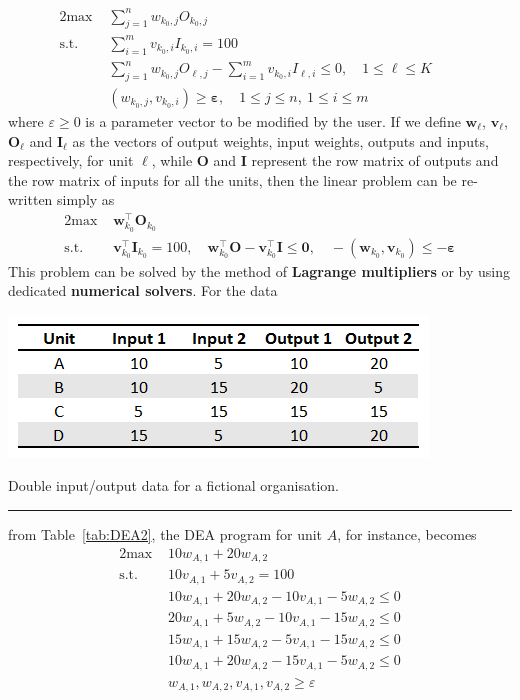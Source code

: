   \begin{alignat*}{2}
    \text{max }   & \sum_{j=1}^n w_{k_0,j}O_{k_0,j} & &\  \\
    \text{s.t. } & \sum_{i=1}^m v_{k_0,i}I_{k_0,i} = 100 &\ & \\
                       & \sum_{j=1}^n w_{k_0,j}O_{\ell,j}-\sum_{i=1}^m v_{k_0,i}I_{\ell,i}\leq 0,\quad 1\leq \ell\leq K\\
                       & (w_{k_0,j},v_{k_0,i})\geq \mathbf{\varepsilon},\quad 1\leq j\leq n,\ 1\leq i\leq m &
  \end{alignat*}
  where $\varepsilon\geq 0$ is a parameter vector to be modified by the user. If we define $\mathbf{w}_{\ell}$,  $\mathbf{v}_{\ell}$, $\mathbf{O}_{\ell}$ and $\mathbf{I}_{\ell}$  as the vectors of output weights, input weights, outputs and inputs, respectively, for unit $\ell$, while $\mathbf{O}$ and $\mathbf{I}$ represent the row matrix of outputs and the row matrix of inputs for all the units, then the linear problem can be re-written simply as   
   \begin{alignat*}{2}
    \text{max }   & \mathbf{w}_{k_0}^{\!\top}\mathbf{O}_{k_0} \  \\
    \text{s.t. } & \mathbf{v}_{k_0}^{\!\top}\mathbf{I}_{k_0} = 100 ,\quad  \mathbf{w}_{k_0}^{\!\top}\mathbf{O}-\mathbf{v}_{k_0}^{\!\top}\mathbf{I}\leq \mathbf{0}, \quad -\left(\mathbf{w}_{k_0},\mathbf{v}_{k_0}\right)\leq -\mathbf{\varepsilon}  
  \end{alignat*} 
  This problem can be solved by the method of \textbf{Lagrange multipliers} or by using dedicated \textbf{numerical solvers}. \newl For the data 
\begin{table}[t]
  \begin{center}
    \includegraphics{Images/DEA2}
  \end{center}
  \caption{\small Double input/output data for a fictional organisation.}\hrule
  \label{tab:DEA2}
\end{table}
  from Table~\ref{tab:DEA2}, the DEA program for unit $A$, for instance, becomes
  \begin{alignat*}{2}
    \text{max }   & 10w_{A,1}+20w_{A,2} \\
    \text{s.t. } & 10v_{A,1}+5v_{A,2} = 100 \\
                       & 10w_{A,1}+20w_{A,2}-10v_{A,1}-5w_{A,2}\leq 0 \\
                       & 20w_{A,1}+5w_{A,2}-10v_{A,1}-15w_{A,2}\leq 0 \\
                       & 15w_{A,1}+15w_{A,2}-5v_{A,1}-15w_{A,2}\leq 0 \\
                       & 10w_{A,1}+20w_{A,2}-15v_{A,1}-5w_{A,2}\leq 0 \\
                       & w_{A,1},w_{A,2},v_{A,1},v_{A,2}\geq \varepsilon
  \end{alignat*}

